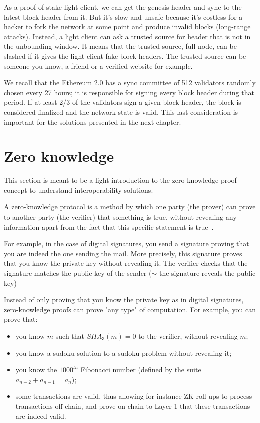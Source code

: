 As a proof-of-stake light client, we can get the genesis header and sync to the latest block header from it. But it's slow and unsafe because it's costless for a hacker to fork the network at some point and produce invalid blocks (long-range attacks). 
Instead, a light client can ask a trusted source for header that is not in the unbounding window. It means that the trusted source, full node, can be slashed if it gives the light client fake block headers. The trusted source can be someone you know, a friend or a verified website for example.

We recall that the Ethereum 2.0 has a sync committee of 512 validators randomly chosen every 27 hours; it is responsible for signing every block header during that period. If at least 2/3 of the validators sign a given block header, the block is considered finalized and the network state is valid. 
This last consideration is important for the solutions presented in the next chapter.



\section{Zero knowledge}
\label{zeroknowledge}
This section is meant to be a light introduction to the zero-knowledge-proof concept to understand interoperability solutions. 

A zero-knowledge protocol is a method by which one party (the prover) can prove to another party (the verifier) that something is true, without revealing any information apart from the fact that this specific statement is true~\cite{Goldwasser}.

For example, in the case of digital signatures, you send a signature proving that you are indeed the one sending the mail. More precisely, this signature proves that you know the private key without revealing it. The verifier checks that the signature matches the public key of the sender ($\sim$ the signature reveals the public key)

Instead of only proving that you know the private key as in digital signatures, zero-knowledge proofs can prove "any type" of computation. For example, you can prove that: 
\begin{itemize}
    \item you know $m$ such that $SHA_3(m)=0$ to the verifier, without revealing $m$; 
    \item you know a sudoku solution to a sudoku problem without revealing it;
    \item you know the $1000^{th}$ Fibonacci number (defined by the suite $a_{n-2}+a_{n-1}=a_n$);
    \item some transactions are valid, thus allowing for instance ZK roll-ups to process transactions off chain, and prove on-chain to Layer 1 that these transactions are indeed valid. 
\end{itemize}

